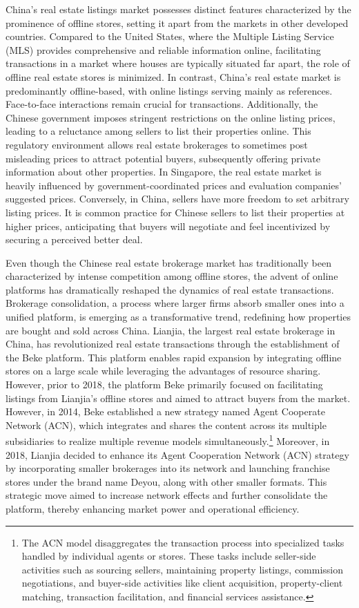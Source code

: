 \documentclass[11pt]{article}
\begin{document}
China's real estate listings market possesses distinct features characterized by the prominence of offline stores, setting it apart from the markets in other developed countries. Compared to the United States, where the Multiple Listing Service (MLS) provides comprehensive and reliable information online, facilitating transactions in a market where houses are typically situated far apart, the role of offline real estate stores is minimized. In contrast, China's real estate market is predominantly offline-based, with online listings serving mainly as references. Face-to-face interactions remain crucial for transactions. Additionally, the Chinese government imposes stringent restrictions on the online listing prices, leading to a reluctance among sellers to list their properties online. This regulatory environment allows real estate brokerages to sometimes post misleading prices to attract potential buyers, subsequently offering private information about other properties. In Singapore, the real estate market is heavily influenced by government-coordinated prices and evaluation companies' suggested prices. Conversely, in China, sellers have more freedom to set arbitrary listing prices. It is common practice for Chinese sellers to list their properties at higher prices, anticipating that buyers will negotiate and feel incentivized by securing a perceived better deal.

Even though the Chinese real estate brokerage market has traditionally been characterized by intense competition among offline stores, the advent of online platforms has dramatically reshaped the dynamics of real estate transactions. Brokerage consolidation, a process where larger firms absorb smaller ones into a unified platform, is emerging as a transformative trend, redefining how properties are bought and sold across China. Lianjia, the largest real estate brokerage in China, has revolutionized real estate transactions through the establishment of the Beke platform. This platform enables rapid expansion by integrating offline stores on a large scale while leveraging the advantages of resource sharing. However, prior to 2018, the platform Beke primarily focused on facilitating listings from Lianjia's offline stores and aimed to attract buyers from the market. However, in 2014, Beke established a new strategy named Agent Cooperate Network (ACN), which integrates and shares the content across its multiple subsidiaries to realize multiple revenue models simultaneously.\footnote{The ACN model disaggregates the transaction process into specialized tasks handled by individual agents or stores. These tasks include seller-side activities such as sourcing sellers, maintaining property listings, commission negotiations, and buyer-side activities like client acquisition, property-client matching, transaction facilitation, and financial services assistance.} Moreover, in 2018, Lianjia decided to enhance its Agent Cooperation Network (ACN) strategy by incorporating smaller brokerages into its network and launching franchise stores under the brand name Deyou, along with other smaller formats. This strategic move aimed to increase network effects and further consolidate the platform, thereby enhancing market power and operational efficiency.
\end{document}
